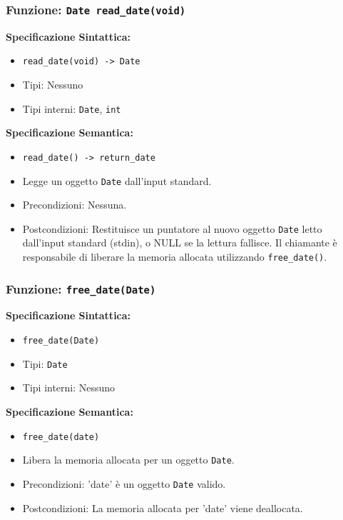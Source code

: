 \documentclass[11pt]{scrartcl} %
\begin{document}
\subsubsection{Funzione: \texttt{Date read\_date(void)}}

\textbf{Specificazione Sintattica:}
\begin{itemize}
	\item \texttt{read\_date(void) -> Date}
	\item Tipi: Nessuno
	\item Tipi interni: \texttt{Date}, \texttt{int}
\end{itemize}

\textbf{Specificazione Semantica:}
\begin{itemize}
	\item \texttt{read\_date() -> return\_date}
	\item Legge un oggetto \texttt{Date} dall'input standard.
	\item Precondizioni: Nessuna.
	\item Postcondizioni: Restituisce un puntatore al nuovo oggetto \texttt{Date} letto dall'input standard (stdin), o NULL se la lettura fallisce. Il chiamante è responsabile di liberare la memoria allocata utilizzando \texttt{free\_date()}.
\end{itemize}

\subsubsection{Funzione: \texttt{free\_date(Date)}}

\textbf{Specificazione Sintattica:}
\begin{itemize}
	\item \texttt{free\_date(Date)}
	\item Tipi: \texttt{Date}
	\item Tipi interni: Nessuno
\end{itemize}

\textbf{Specificazione Semantica:}
\begin{itemize}
	\item \texttt{free\_date(date)}
	\item Libera la memoria allocata per un oggetto \texttt{Date}.
	\item Precondizioni: 'date' è un oggetto \texttt{Date} valido.
	\item Postcondizioni: La memoria allocata per 'date' viene deallocata.
\end{itemize}
\end{document}
